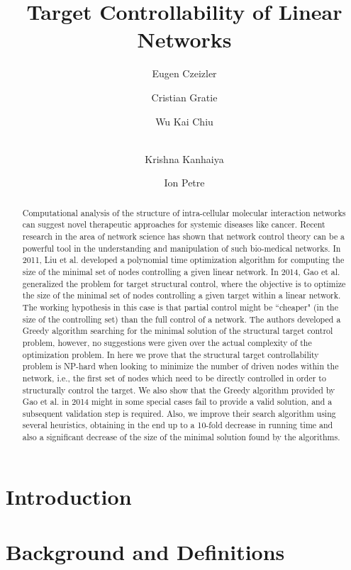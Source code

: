 \documentclass[oribibl]{llncs}
\title{Target Controllability of Linear Networks}
\author{Eugen Czeizler\inst{1} \and Cristian Gratie\inst{1} \and Wu Kai Chiu\inst{1} \and\\ Krishna Kanhaiya\inst{1} \and Ion Petre\inst{1}}
\institute{Computational Biomdeling Laboratory, Turku Centre for Computer Science and Department of Computer Science, {\AA}bo Akademi University, Turku, Finland}
\begin{document}

\maketitle
\begin{abstract}
Computational analysis of the structure of intra-cellular molecular interaction networks can suggest novel therapeutic approaches for systemic diseases like cancer. Recent research in the area of network science has shown that network control theory can be a powerful tool in the understanding and manipulation of such bio-medical networks. In 2011, Liu et al. developed a polynomial time optimization algorithm for computing the size of the minimal set of nodes controlling a given linear network. In 2014, Gao et al. generalized the problem for target structural control, where the objective is to optimize the size of the minimal set of nodes controlling a given target within a linear network. The working hypothesis in this case is that partial control might be ``cheaper" (in the size of the controlling set) than the full control of a network. The authors developed a Greedy algorithm searching for the minimal solution of the structural target control problem, however, no suggestions were given over the actual complexity of the optimization problem. In here we prove that the structural target controllability problem is NP-hard when looking to minimize the number of driven nodes within the network, i.e., the first set of nodes which need to be directly controlled in order to structurally control the target. We also show that the Greedy algorithm provided by Gao et al. in 2014 might in some special cases fail to provide a valid solution, and a subsequent validation step is required. Also, we improve their search algorithm using several heuristics, obtaining in the end up to a 10-fold decrease in running time and also a significant decrease of the size of the minimal solution found by the algorithms.





\end{abstract}

\section{Introduction}



\section{Background and Definitions}
\end{document}

